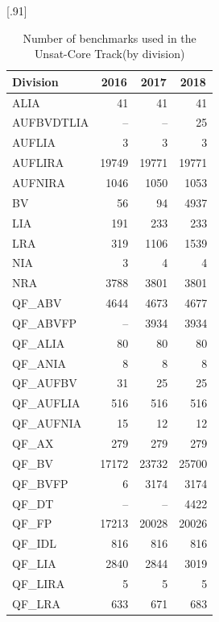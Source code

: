 \documentclass[dvipsnames,table,twoside,11pt]{article}
\newcommand{\ucoretrack}{Unsat-Core Track\xspace}
\begin{document}
\begin{table}
  \caption{Number of benchmarks used in the \ucoretrack (by
    division)}
  \label{table:benchmarks-unsat-core-track}
  \centering
  \scalebox{1}[.91]{\begin{tabular}{lrrr}
    \toprule
    Division & \multicolumn{1}{c}{2016} & \multicolumn{1}{c}{2017} & \multicolumn{1}{c}{2018} \\
    \midrule
    ALIA       &     41 &     41 &     41 \\
    AUFBVDTLIA &     -- &     -- &     25 \\
    AUFLIA     &      3 &      3 &      3 \\
    AUFLIRA    &  19749 &  19771 &  19771 \\
    AUFNIRA    &   1046 &   1050 &   1053 \\
    BV         &     56 &     94 &   4937 \\
    LIA        &    191 &    233 &    233 \\
    LRA        &    319 &   1106 &   1539 \\
    NIA        &      3 &      4 &      4 \\
    NRA        &   3788 &   3801 &   3801 \\
    QF\_ABV    &   4644 &   4673 &   4677 \\
    QF\_ABVFP  &     -- &   3934 &   3934 \\
    QF\_ALIA   &     80 &     80 &     80 \\
    QF\_ANIA   &      8 &      8 &      8 \\
    QF\_AUFBV  &     31 &     25 &     25 \\
    QF\_AUFLIA &    516 &    516 &    516 \\
    QF\_AUFNIA &     15 &     12 &     12 \\
    QF\_AX     &    279 &    279 &    279 \\
    QF\_BV     &  17172 &  23732 &  25700 \\
    QF\_BVFP   &      6 &   3174 &   3174 \\
    QF\_DT     &     -- &     -- &   4422 \\
    QF\_FP     &  17213 &  20028 &  20026 \\
    QF\_IDL    &    816 &    816 &    816 \\
    QF\_LIA    &   2840 &   2844 &   3019 \\
    QF\_LIRA   &      5 &      5 &      5 \\
    QF\_LRA    &    633 &    671 &    683 \\

\end{tabular}}
\end{table}
\end{document}
